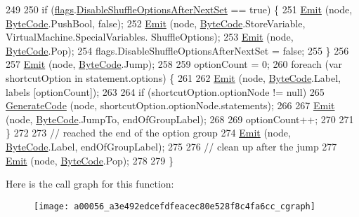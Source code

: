 \begin{DoxyCode}
249 
250             \textcolor{keywordflow}{if} (\hyperlink{a00056_a541022d89bcf9bc8f794eb6d6b438d08}{flags}.\hyperlink{a00056_a8b49bb7763ff477cba21d7c771ef3ed0}{DisableShuffleOptionsAfterNextSet} == \textcolor{keyword}{true}) \{
251                 \hyperlink{a00056_a774e8c143cdda0584fcfdda98626a83c}{Emit} (node, \hyperlink{a00053_ad5dfb6ee68ca7469623ad3e459f98894}{ByteCode}.PushBool, \textcolor{keyword}{false});
252                 \hyperlink{a00056_a774e8c143cdda0584fcfdda98626a83c}{Emit} (node, \hyperlink{a00053_ad5dfb6ee68ca7469623ad3e459f98894}{ByteCode}.StoreVariable, VirtualMachine.SpecialVariables.
      ShuffleOptions);
253                 \hyperlink{a00056_a774e8c143cdda0584fcfdda98626a83c}{Emit} (node, \hyperlink{a00053_ad5dfb6ee68ca7469623ad3e459f98894}{ByteCode}.Pop);
254                 flags.DisableShuffleOptionsAfterNextSet = \textcolor{keyword}{false};
255             \}
256 
257             \hyperlink{a00056_a774e8c143cdda0584fcfdda98626a83c}{Emit} (node, \hyperlink{a00053_ad5dfb6ee68ca7469623ad3e459f98894}{ByteCode}.Jump);
258 
259             optionCount = 0;
260             \textcolor{keywordflow}{foreach} (var shortcutOption \textcolor{keywordflow}{in} statement.options) \{
261 
262                 \hyperlink{a00056_a774e8c143cdda0584fcfdda98626a83c}{Emit} (node, \hyperlink{a00053_ad5dfb6ee68ca7469623ad3e459f98894}{ByteCode}.Label, labels [optionCount]);
263 
264                 \textcolor{keywordflow}{if} (shortcutOption.optionNode != null)
265                     \hyperlink{a00056_a006f3becd521cc179ba3d3352f6f930b}{GenerateCode} (node, shortcutOption.optionNode.statements);
266 
267                 \hyperlink{a00056_a774e8c143cdda0584fcfdda98626a83c}{Emit} (node, \hyperlink{a00053_ad5dfb6ee68ca7469623ad3e459f98894}{ByteCode}.JumpTo, endOfGroupLabel);
268 
269                 optionCount++;
270 
271             \}
272 
273             \textcolor{comment}{// reached the end of the option group}
274             \hyperlink{a00056_a774e8c143cdda0584fcfdda98626a83c}{Emit} (node, \hyperlink{a00053_ad5dfb6ee68ca7469623ad3e459f98894}{ByteCode}.Label, endOfGroupLabel);
275 
276             \textcolor{comment}{// clean up after the jump}
277             \hyperlink{a00056_a774e8c143cdda0584fcfdda98626a83c}{Emit} (node, \hyperlink{a00053_ad5dfb6ee68ca7469623ad3e459f98894}{ByteCode}.Pop);
278 
279         \}
\end{DoxyCode}


Here is the call graph for this function\-:
\nopagebreak
\begin{figure}[H]
\begin{center}
\leavevmode
\texttt{[image: a00056\_a3e492edcefdfeacec80e528f8c4fa6cc\_cgraph]}
\end{center}
\end{figure}


